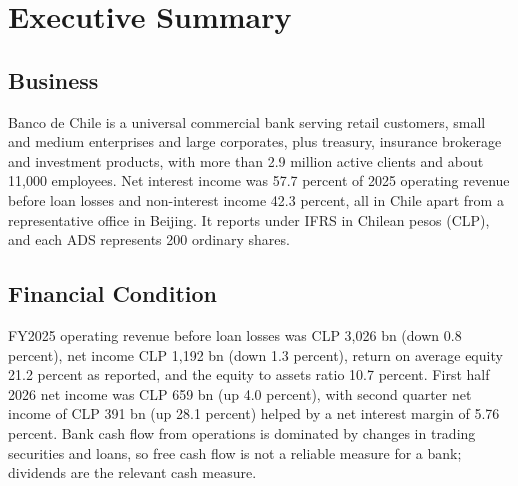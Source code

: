 \documentclass[10pt,a4paper]{article}
\begin{document}
\makeocadcover

\section{Executive Summary}

\subsection{Business}
Banco de Chile is a universal commercial bank serving retail customers, small and medium enterprises and large corporates, plus treasury, insurance brokerage and investment products, with more than 2.9 million active clients and about 11,000 employees. Net interest income was 57.7 percent of 2025 operating revenue before loan losses and non-interest income 42.3 percent, all in Chile apart from a representative office in Beijing. It reports under IFRS in Chilean pesos (CLP), and each ADS represents 200 ordinary shares.

\subsection{Financial Condition}
FY2025 operating revenue before loan losses was CLP 3,026 bn (down 0.8 percent), net income CLP 1,192 bn (down 1.3 percent), return on average equity 21.2 percent as reported, and the equity to assets ratio 10.7 percent. First half 2026 net income was CLP 659 bn (up 4.0 percent), with second quarter net income of CLP 391 bn (up 28.1 percent) helped by a net interest margin of 5.76 percent. Bank cash flow from operations is dominated by changes in trading securities and loans, so free cash flow is not a reliable measure for a bank; dividends are the relevant cash measure.
\end{document}
